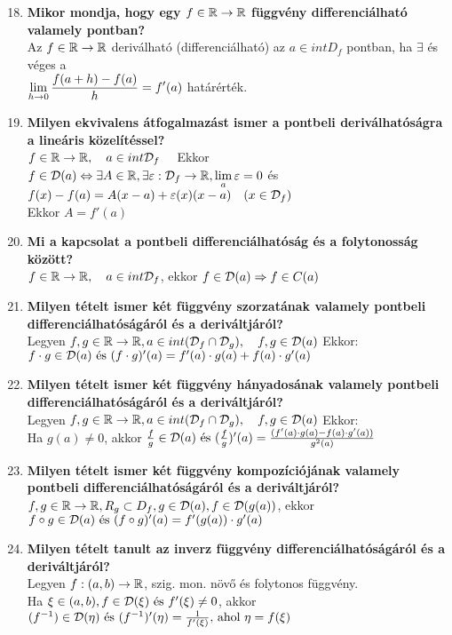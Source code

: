 \documentclass[a4paper,11pt]{article}
\begin{document}
\begin{enumerate}
	\setcounter{enumi}{17}
	\item \textbf{Mikor mondja, hogy egy $f\in\displaystyle\mathbb{R}\to\mathbb{R}$ függvény differenciálható valamely pontban?}\\[0.1cm]Az $f\in\displaystyle\mathbb{R}\to\mathbb{R}$ deriválható (differenciálható) az $a\in int D_f$ pontban, ha $\exists$ és véges a\\[0.1cm]$\displaystyle\lim_{h\to0}\frac{f(a+h)-f(a)}{h}=f'(a)$ határérték.
	\item \textbf{Milyen ekvivalens átfogalmazást ismer a pontbeli deriválhatóságra a lineáris közelítéssel?}\\[0.1cm]$f\in\displaystyle\mathbb{R}\to\mathbb{R},\quad a\in int\mathcal{D}_f\quad$ Ekkor\\[0.1cm]$f\in\mathcal{D}(a)\Leftrightarrow\exists A\in\mathbb{R}, \exists\varepsilon:\mathcal{D}_f\to\mathbb{R},\displaystyle\lim_{a}\varepsilon=0$ és $f(x)-f(a)=A(x-a)+ \varepsilon(x)(x-a)\quad(x\in\mathcal{D}_f)$\\[0.1cm]Ekkor $A=f'(a)$
	\item \textbf{Mi a kapcsolat a pontbeli differenciálhatóság és a folytonosság között?}\\[0.1cm]$f\in\displaystyle\mathbb{R}\to\mathbb{R},\quad a\in int\mathcal{D}_f$, ekkor\hspace{1cm} $f\in\mathcal{D}(a)\Rightarrow f\in C(a)$
	\item \textbf{Milyen tételt ismer két függvény szorzatának valamely pontbeli differenciálhatóságáról és a deriváltjáról?}\\[0.1cm]Legyen $f,g\in\displaystyle\mathbb{R}\to\mathbb{R},a\in int(\mathcal{D}_f\cap\mathcal{D}_g),\quad f,g\in\mathcal{D}(a)$ Ekkor:\\[0.1cm] $f\cdot g\in\mathcal{D}(a)\text{ és }(f\cdot g)'(a)= f'(a)\cdot g(a)+f(a)\cdot g'(a)$
	\item \textbf{Milyen tételt ismer két függvény hányadosának valamely pontbeli differenciálhatóságáról és a deriváltjáról?}\\[0.1cm]Legyen $f,g\in\displaystyle\mathbb{R}\to\mathbb{R},a\in int(\mathcal{D}_f\cap\mathcal{D}_g),\quad f,g\in\mathcal{D}(a)$ Ekkor:\\[0.1cm] Ha $g(a)\neq0$, akkor $\frac{f}{g}\in\mathcal{D}(a)\text{ és } (\frac{f}{g})'(a) =\frac{(f'(a)\cdot g(a)-f(a)\cdot g'(a))}{g^2(a)}$
	\item \textbf{Milyen tételt ismer két függvény kompozíciójának valamely pontbeli differenciálhatóságáról és a deriváltjáról?}\\[0.1cm] $f,g\in\displaystyle\mathbb{R}\to\mathbb{R},R_g\subset D_f,g \in\mathcal{D}(a),f\in\mathcal{D}(g(a))$, ekkor\\[0.1cm] $f\circ g\in\mathcal{D}(a)\text{ és }(f\circ g)'(a)= f'(g(a))\cdot g'(a)$\newpage
	\item \textbf{Milyen tételt tanult az inverz függvény differenciálhatóságáról és a deriváltjáról?}\\[0.1cm]Legyen $f:(a,b)\to\mathbb{R}$, szig. mon. növő és folytonos függvény.\\[0.1cm]Ha $\xi\in(a,b),f\in\mathcal{D}(\xi) \text{ és }f'(\xi)\neq0$, akkor\\[0.1cm] $(f^{-1})\in\mathcal{D}(\eta)\text{ és }(f^{-1})'(\eta)=\frac{1}{f'(\xi)}\text{, ahol }\eta=f(\xi)$

\end{enumerate}
\end{document}
